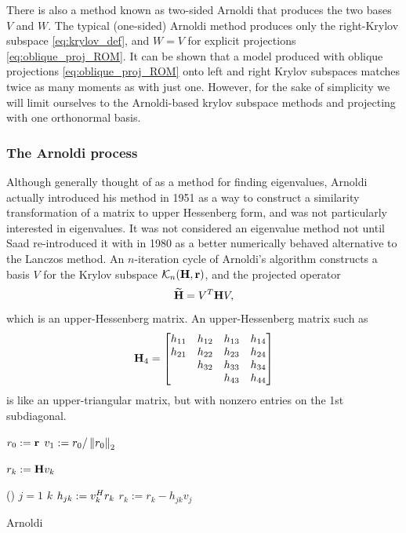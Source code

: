 There is also a method known as two-sided Arnoldi that produces the two bases $V$ and $W$.
The typical (one-sided) Arnoldi method produces only the right-Krylov subspace  \eqref{eq:krylov_def}, and $W=V$ for explicit projections \eqref{eq:oblique_proj_ROM}. 
It can be shown that a model produced with oblique projections \eqref{eq:oblique_proj_ROM} onto left and right  Krylov subspaces matches twice as many moments as with just one.  However, for the sake of simplicity we will limit ourselves to the Arnoldi-based krylov subspace methods and projecting with one orthonormal basis.


\subsubsection{The Arnoldi process}
   \label{sec:arnoldi}
   Although generally thought of as a method for finding eigenvalues, Arnoldi actually introduced his method \cite{arnoldi} in 1951 as a way to construct a similarity transformation  of a matrix to upper Hessenberg form, and was not particularly interested in eigenvalues.  It was not considered an eigenvalue method not until Saad re-introduced it with \cite{saad1980} in 1980 as a better numerically behaved alternative to the Lanczos method. An $n$-iteration  cycle of Arnoldi's algorithm constructs a basis $V$ for the Krylov 
   subspace $\krylov{n}{\H}{\Rr}$, and the projected operator
\[
\Himp = V^T \H V,
\]
 which is an upper-Hessenberg matrix.  An upper-Hessenberg matrix such as
\[
\H_4 = \mat{h_{11}&h_{12}&h_{13}&h_{14}\\
       h_{21}&h_{22}&h_{23}&h_{24} \\
	&h_{32}&h_{33}&h_{34}\\ 
	&&h_{43}&h_{44}\\}
\]
is like an upper-triangular matrix, but with nonzero entries on the 1st subdiagonal.   

\begin{algorithm}[htb]%
\DontPrintSemicolon
{}

$r_0 := \Rr$ \;
$v_1 := r_0 / \nrm{2}{r_0}$\;
 {
	$r_k := \H v_{k}$\; \label{Arnoldi_mult}

	\For(\qquad{}){ $j = 1$ \KwTo $k$}{	\label{Arnoldi_ortho1}
		$h_{jk} := \c{v_k}r_k$ \label{Arnoldi_ortho1_5} \;
		$r_k := r_k - h_{jk}v_j$\; \label{Arnoldi_ortho2}
}
\BlankLine
}
\;
\caption{{\sc Arnoldi}}
\label{alg:arnoldi}
\end{algorithm}


